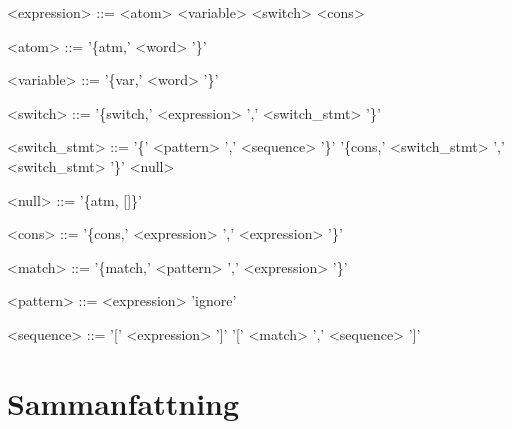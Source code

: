 \documentclass[a4paper, 11pt]{article}
\begin{document}
\begin{grammar}
<expression> ::= <atom>
\alt <variable>
\alt <switch>
\alt <cons>

<atom> ::= '\{atm,' <word> '\}'

<variable> ::= '\{var,' <word> '\}'

<switch> ::= '\{switch,' <expression> ',' <switch_stmt> '\}'

<switch_stmt> ::= '\{' <pattern> ',' <sequence> '\}'
\alt '\{cons,' <switch_stmt> ',' <switch_stmt> '\}'
\alt <null>

<null> ::= '\{atm, []\}'

<cons> ::= '\{cons,' <expression> ',' <expression> '\}'

<match> ::= '\{match,' <pattern> ',' <expression> '\}'

<pattern> ::= <expression>
\alt 'ignore'

<sequence> ::= '[' <expression> ']'
	\alt '[' <match> ',' <sequence> ']'
\end{grammar}

\section{Sammanfattning}
\end{document}

